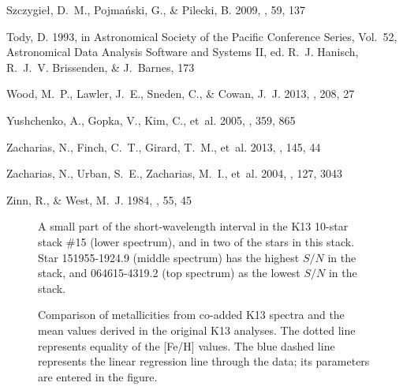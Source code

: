 \documentclass[preprint]{aastex6}
\begin{document}
\begin{thebibliography}{}
{Szczygie{\l}}, D.~M., {Pojma{\'n}ski}, G., \& {Pilecki}, B. 2009, \actaa, 59,
  137

{Tody}, D. 1993, in Astronomical Society of the Pacific Conference Series,
  Vol.~52, Astronomical Data Analysis Software and Systems II, ed. R.~J.
  {Hanisch}, R.~J.~V. {Brissenden}, \& J.~{Barnes}, 173

{Wood}, M.~P., {Lawler}, J.~E., {Sneden}, C., \& {Cowan}, J.~J. 2013, \apjs,
  208, 27

{Yushchenko}, A., {Gopka}, V., {Kim}, C., {et~al.} 2005, \mnras, 359, 865

{Zacharias}, N., {Finch}, C.~T., {Girard}, T.~M., {et~al.} 2013, \aj, 145, 44

{Zacharias}, N., {Urban}, S.~E., {Zacharias}, M.~I., {et~al.} 2004, \aj, 127,
  3043

{Zinn}, R., \& {West}, M.~J. 1984, \apjs, 55, 45

\end{thebibliography}






\clearpage
\begin{figure}
\caption{\label{f1}
\footnotesize
   A small part of the short-wavelength interval in the K13 10-star stack 
   \#15 (lower spectrum), and in two of the stars in this stack.
   Star 151955-1924.9 (middle spectrum) has the highest $S/N$ in the
   stack, and 064615-4319.2 (top spectrum) as the lowest $S/N$ in the stack.
}
\end{figure}


\clearpage
\begin{figure}
\caption{\label{f2}
\footnotesize
   Comparison of metallicities from co-added K13 spectra and the mean
   values derived in the original K13 analyses.
   The dotted line represents equality of the [Fe/H] values.
   The blue dashed line represents the linear regression
   line through the data; its parameters are entered in the figure.
}
\end{figure}
\end{document}
